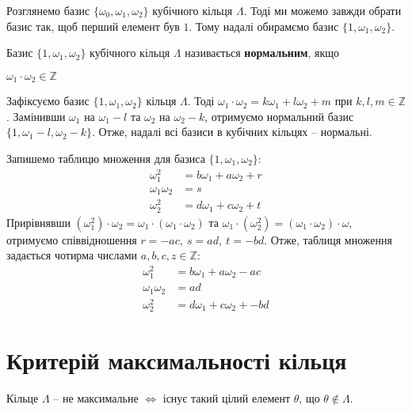 \documentclass{thesis}
\begin{document}
\begin{remark}
Розглянемо базис $\{\omega_0,\omega_1,\omega_2\}$ кубічного кільця $\Lambda$. Тоді ми можемо завжди обрати базис так, щоб перший елемент був $1$. Тому надалі обирамємо базис $\{1,\omega_1,\omega_2\}$.
\end{remark}

\begin{definition}
Базис $\{1,\omega_1,\omega_2\}$ кубічного кільця $\Lambda$ називається \textbf{нормальним}, якщо
\begin{center}
$\omega_1 \cdot \omega_2 \in \mathbb{Z}$
\end{center}
\end{definition}

\begin{remark}
Зафіксуємо базис $\{1,\omega_1,\omega_2\}$ кільця $\Lambda$. Тоді $\omega_1 \cdot \omega_2 = k \omega_1 + l \omega_2 + m$ при $k,l,m \in \mathbb{Z}$. Замінивши $\omega_1$ на $\omega_1-l$ та $\omega_2$ на $\omega_2 - k$, отримуємо нормальний базис $\{1,\omega_1 - l, \omega_2 - k\}$. Отже, надалі всі базиси в кубічних кільцях -- нормальні.
\end{remark}

Запишемо таблицю множення для базиса $\{1,\omega_1,\omega_2\}$:
\begin{align*}
\omega_1^2 & = b \omega_1 + a \omega_2 + r \\
\omega_1 \omega_2 & = s \\
\omega_2^2 & = d \omega_1 + c \omega_2 + t
\end{align*}
Прирівнявши $(\omega_1^2) \cdot \omega_2 = \omega_1 \cdot (\omega_1 \cdot \omega_2)$ та $\omega_1 \cdot (\omega_2^2) = (\omega_1 \cdot \omega_2) \cdot \omega$, отримуємо співвідношення $r = -ac,\ s = ad,\ t = -bd$. Отже, таблиця множення задається чотирма числами $a,b,c,z \in \mathbb{Z}$:
\begin{align*}
\omega_1^2 & = b \omega_1 + a \omega_2 - ac \\
\omega_1 \omega_2 & = ad \\
\omega_2^2 & = d \omega_1 + c \omega_2 + -bd
\end{align*}

\section{Критерій максимальності кільця}
\begin{theorem}
Кільце $\Lambda$ -- не максимальне $\iff$ існує такий цілий елемент $\theta$, що $\theta \notin \Lambda$. 
\end{theorem}
\end{document}
